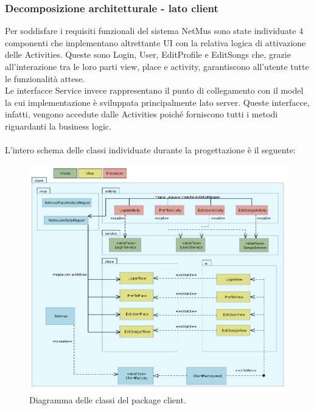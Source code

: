 \newpage
\subsubsection{Decomposizione architetturale - lato client}
Per soddisfare i requisiti funzionali del sistema NetMus sono state individuate
4 componenti che implementano altrettante UI con la relativa logica di
attivazione delle Activities. Queste sono Login, User, EditProfile e EditSongs
che, grazie all'interazione tra le loro parti view, place e activity,
garantiscono all'utente tutte le funzionalit\`a attese.\\
Le interfacce Service invece rappresentano il punto di collegamento con il model
la cui implementazione \`e sviluppata principalmente lato server. Queste
interfacce, infatti, vengono accedute dalle Activities poich\'e forniscono tutti i
metodi riguardanti la business logic. \\\\ 
L'intero schema delle classi individuate durante la progettazione \`e il
seguente: 
\begin{figure}[h]
  \centering
  \includegraphics[width=16.5cm]{img/ST/client.png}
\caption{Diagramma delle classi del package client.}
\end{figure}
\newpage
